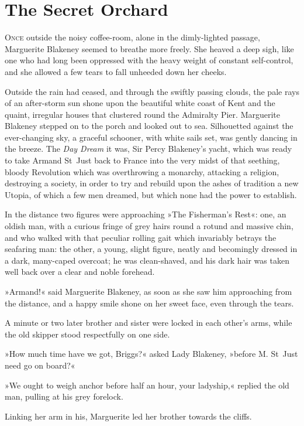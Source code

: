 
\chapter{The Secret Orchard}
\lettrine[lines=4]{O}{nce} outside the noisy coffee-room, alone in the dimly-lighted passage, Marguerite Blakeney  seemed to breathe more freely. She heaved a deep sigh, like one who had long been oppressed with the heavy weight of constant self-control, and she allowed a few tears to fall unheeded down her cheeks.

Outside the rain had ceased, and through the swiftly passing clouds, the pale rays of an after-storm sun shone upon the beautiful white coast of Kent and the quaint, irregular houses that clustered round the Admiralty Pier. Marguerite Blakeney stepped on to the porch and looked out to sea. Silhouetted against the ever-changing sky, a graceful schooner, with white sails set, was gently dancing in the breeze. The \textit{Day Dream} it was, Sir Percy Blakeney's yacht, which was ready to take Armand St~Just back to France into the very midst of that seething, bloody Revolution which was overthrowing a monarchy, attacking a religion, destroying a society, in order to try and rebuild upon the ashes of tradition a new Utopia, of which a few men dreamed, but which none had the power to establish.

In the distance two figures were approaching »The Fisherman's Rest«: one, an oldish man, with a curious fringe of grey hairs round a rotund and massive chin, and who walked with that peculiar rolling gait which invariably betrays the seafaring man: the other, a young, slight figure, neatly and becomingly dressed in a dark, many-caped overcoat; he was clean-shaved, and his dark hair was taken well back over a clear and noble forehead.

»Armand!« said Marguerite Blakeney, as soon as she saw him approaching from the distance, and a happy smile shone on her sweet face, even through the tears.

A minute or two later brother and sister were locked in each other's arms, while the old skipper stood respectfully on one side.

»How much time have we got, Briggs?« asked Lady Blakeney, »before M. St~Just need go on board?«

»We ought to weigh anchor before half an hour, your ladyship,« replied the old man, pulling at his grey forelock.

Linking her arm in his, Marguerite led her brother towards the cliffs.

